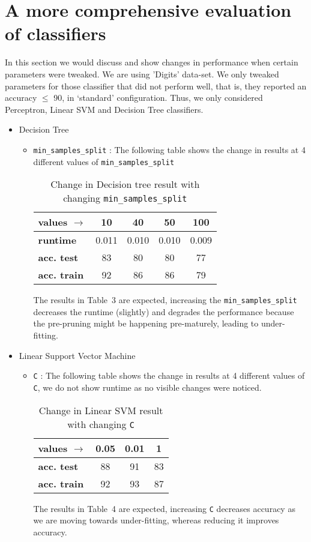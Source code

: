 \documentclass[12pt]{article}
\begin{document}
\section*{A more comprehensive evaluation of classifiers}

In this section we would discuss and show changes in performance when certain parameters were tweaked. We are using 'Digits' data-set. We only tweaked parameters for those classifier that did not perform well, that is, they reported an accuracy $\leq$ 90, in `standard' configuration. Thus, we only considered Perceptron, Linear SVM and Decision Tree classifiers. 

\begin{itemize}
\item Decision Tree
\begin{itemize}
\item \texttt{min\_samples\_split} : The following table shows the change in results at 4 different values of \texttt{min\_samples\_split}
\begin{table}[!hptb]
\centering
\begin{tabular}{|l|c|c|c|c|}
\hline
\textbf{values $\to$} & \textbf{10} & \textbf{40} & \textbf{50} & \textbf{100} \\\hline
\textbf{runtime} & 0.011 & 0.010 & 0.010 & 0.009 \\
\textbf{acc. test} & 83 & 80 & 80 & 77 \\
\textbf{acc. train} & 92 & 86 & 86 & 79 \\\hline
\end{tabular}
\caption{Change in Decision tree result with changing \texttt{min\_samples\_split}}
\end{table}
The results in Table~3 are expected, increasing the \texttt{min\_samples\_split} decreases the runtime (slightly) and degrades the performance because the pre-pruning might be happening pre-maturely, leading to under-fitting.
\end{itemize}

\item Linear Support Vector Machine
\begin{itemize}
\item \texttt{C} : The following table shows the change in results at 4 different values of \texttt{C}, we do not show runtime as no visible changes were noticed.
\begin{table}[!hptb]
\centering
\begin{tabular}{|l|c|c|c|}
\hline
\textbf{values $\to$} & \textbf{0.05} & \textbf{0.01} & \textbf{1} \\\hline
\textbf{acc. test} & 88 & 91 & 83 \\
\textbf{acc. train} & 92 & 93 & 87 \\\hline
\end{tabular}
\caption{Change in Linear SVM result with changing \texttt{C}}
\end{table}
The results in Table~4 are expected, increasing \texttt{C} decreases accuracy as we are moving towards under-fitting, whereas reducing it improves accuracy.
\end{itemize}


\end{itemize}
\end{document}
